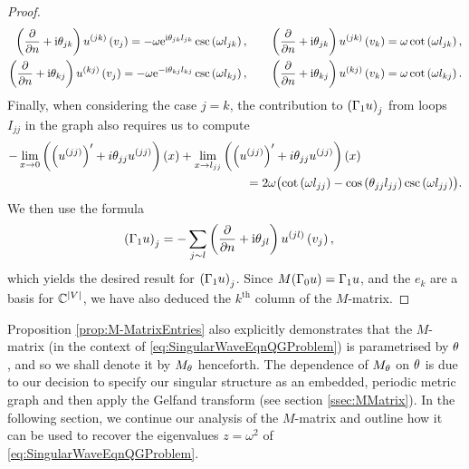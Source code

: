 \begin{proof}
\begin{align*}
		\left( \dfrac{\partial }{\partial n}+\mathrm{i}\theta_{jk} \right)u^{(jk)}\left( v_j \right) = -\omega \mathrm{e}^{\mathrm{i}\theta_{jk}l_{jk}}\csc\left( \omega l_{jk} \right), 
		&\qquad \left( \dfrac{\partial }{\partial n}+\mathrm{i}\theta_{jk} \right)u^{(jk)}\left( v_k \right) = \omega\cot\left( \omega l_{jk} \right), \\
		\left( \dfrac{\partial }{\partial n}+\mathrm{i}\theta_{kj} \right)u^{(kj)}\left( v_j \right) = -\omega \mathrm{e}^{-\mathrm{i}\theta_{kj}l_{kj}}\csc\left( \omega l_{kj} \right), 
		&\qquad \left( \dfrac{\partial }{\partial n}+\mathrm{i}\theta_{kj} \right)u^{(kj)}\left( v_k \right) = \omega\cot\left( \omega l_{kj} \right).
	\end{align*}
	Finally, when considering the case $j=k$, the contribution to $\left( \Gamma_1 u \right)_j$ from loops $I_{jj}$ in the graph also requires us to compute
	\begin{align*}
		-\lim_{x\rightarrow0}\left( \left( u^{(jj)} \right)'+i\theta_{jj}u^{(jj)} \right)(x) + \lim_{x\rightarrow l_{jj}} & \left( \left( u^{(jj)} \right)'+i\theta_{jj}u^{(jj)} \right)(x) \\
		&\qquad = 2\omega\bigl( \cot\left( \omega l_{jj} \right) - \cos\left( \theta_{jj}l_{jj} \right)\csc\left( \omega l_{jj} \right) \bigr).	
	\end{align*}
	We then use the formula
	\begin{align*}
		\left( \Gamma_1 u \right)_j &= -\sum_{j\sim l} \left( \dfrac{\partial }{\partial n}+\mathrm{i}\theta_{jl} \right)u^{(jl)}\left( v_j \right),
	\end{align*}
	which yields the desired result for $\left( \Gamma_1 u \right)_j$.
	Since $M(\Gamma_0 u) = \Gamma_1 u$, and the $e_k$ are a basis for $\mathbb{C}^{\left\lvert V \right\rvert}$, we have also deduced the $k^{\text{th}}$ column of the $M$-matrix.
\end{proof}
Proposition \ref{prop:M-MatrixEntries} also explicitly demonstrates that the $M$-matrix (in the context of \eqref{eq:SingularWaveEqnQGProblem}) is parametrised by $\theta$, and so we shall denote it by $M_{\theta}$ henceforth.
The dependence of $M_\theta$ on $\theta$ is due to our decision to specify our singular structure as an embedded, periodic metric graph and then apply the Gelfand transform (see section \ref{ssec:MMatrix}).
In the following section, we continue our analysis of the $M$-matrix and outline how it can be used to recover the eigenvalues $z=\omega^2$ of \eqref{eq:SingularWaveEqnQGProblem}.

